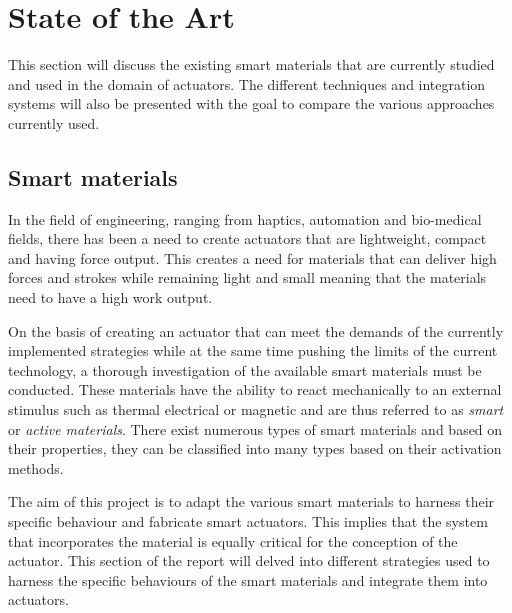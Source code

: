 \section{State of the Art} \label{sec:sota}
This section will discuss the existing smart materials that are currently studied and used in the domain of actuators. The different techniques and integration systems will also be presented with the goal to compare the various approaches currently used.

\subsection{Smart materials} \label{subsec:Smartmaterials}
In the field of engineering, ranging from haptics, automation and bio-medical fields, there has been a need  to create actuators that are lightweight, compact and having force output. This creates a need for materials that can deliver high forces and strokes while remaining light and small meaning that the materials need to have a high work output.

On the basis of creating an actuator that can meet the demands of the currently implemented strategies while at the same time pushing the limits of the current technology, a thorough investigation of the available smart materials must be conducted. These materials have the ability to react mechanically to an external stimulus such as thermal electrical or magnetic and are thus referred to as \emph{smart} or \emph{active materials}. There exist numerous types of smart materials and based on their properties, they can be classified into many types based on their activation methods\cite{damodharan_review_2018}.

The aim of this project is to adapt the various smart materials to harness their specific behaviour and fabricate smart actuators. This implies that the system that incorporates the material is equally critical for the conception of the actuator. This section of the report will delved into different strategies used to harness the specific behaviours of the smart materials and integrate them into actuators.

